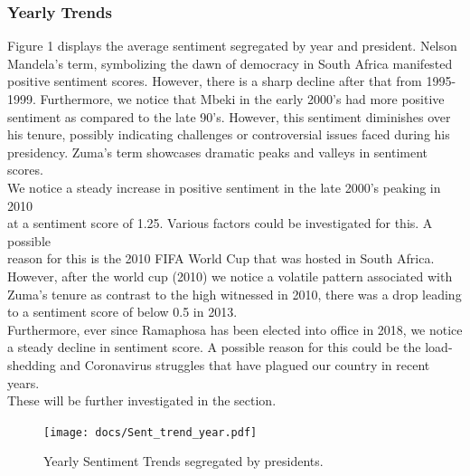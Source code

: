 \documentclass[
  letterpaper,
  DIV=11,
  numbers=noendperiod]{scrartcl}
\begin{document}
\hypertarget{yearly-trends}{%
\subsubsection{Yearly Trends}\label{yearly-trends}}

Figure 1 displays the average sentiment segregated by year and
president. Nelson\\
Mandela's term, symbolizing the dawn of democracy in South Africa
manifested\\
positive sentiment scores. However, there is a sharp decline after that
from 1995-\\
1999. Furthermore, we notice that Mbeki in the early 2000's had more
positive\\
sentiment as compared to the late 90's. However, this sentiment
diminishes over\\
his tenure, possibly indicating challenges or controversial issues faced
during his\\
presidency. Zuma's term showcases dramatic peaks and valleys in
sentiment scores.\\
We notice a steady increase in positive sentiment in the late 2000's
peaking in 2010\\
at a sentiment score of 1.25. Various factors could be investigated for
this. A possible\\
reason for this is the 2010 FIFA World Cup that was hosted in South
Africa.\\
However, after the world cup (2010) we notice a volatile pattern
associated with\\
Zuma's tenure as contrast to the high witnessed in 2010, there was a
drop leading\\
to a sentiment score of below 0.5 in 2013.\\
Furthermore, ever since Ramaphosa has been elected into office in 2018,
we notice\\
a steady decline in sentiment score. A possible reason for this could be
the load-\\
shedding and Coronavirus struggles that have plagued our country in
recent years.\\
These will be further investigated in the section.

\begin{figure}

{\centering \texttt{[image: docs/Sent\_trend\_year.pdf]}

}

\caption{Yearly Sentiment Trends segregated by presidents.}

\end{figure}
\end{document}
